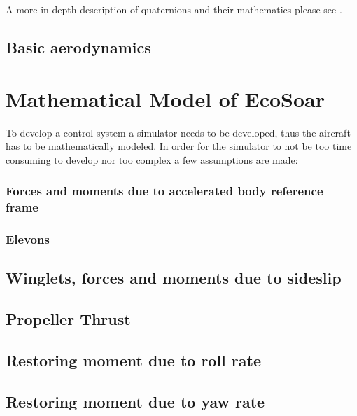 \documentclass{article}
\begin{document}
A more in depth description of quaternions and their mathematics please see \cite{Sola2016}.



\subsection {Basic aerodynamics}


\section{Mathematical Model of EcoSoar}
To develop a control system a simulator needs to be developed, thus the aircraft has to be mathematically modeled.
In order for the simulator to not be too time consuming to develop nor too complex a few assumptions are made:


%



\subsubsection{Forces and moments due to accelerated body reference frame}



\subsubsection{Elevons}


\subsection{Winglets, forces and moments due to sideslip}


\subsection{Propeller Thrust}


\subsection{Restoring moment due to roll rate}
\label{sec:restmomroll}


\subsection{Restoring moment due to yaw rate}

\end{document}
